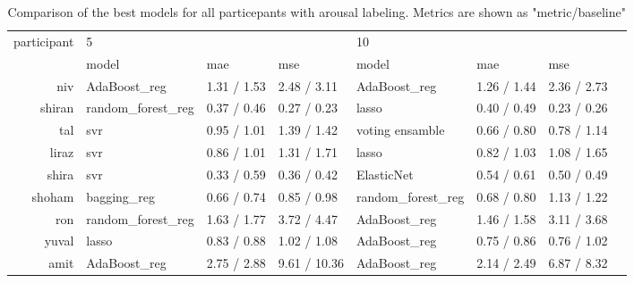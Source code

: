 \documentclass[../main.tex]{subfiles}
\begin{document}
\begin{table}[!h]
    \begin{tabular}{rlllllll}
        \toprule
        participant & \multicolumn{3}{l}{5} & \multicolumn{3}{l}{10} \\
              &               model & mae & mse &              model & mae & mse \\
        \midrule
             niv &       AdaBoost\_reg &         1.31 / 1.53 &        2.48 / 3.11 &       AdaBoost\_reg &         1.26 / 1.44 &        2.36 / 2.73 \\
          shiran &  random\_forest\_reg &         0.37 / 0.46 &        0.27 / 0.23 &              lasso &         0.40 / 0.49 &        0.23 / 0.26 \\
             tal &                svr &         0.95 / 1.01 &        1.39 / 1.42 &    voting ensamble &         0.66 / 0.80 &        0.78 / 1.14 \\
           liraz &                svr &         0.86 / 1.01 &        1.31 / 1.71 &              lasso &         0.82 / 1.03 &        1.08 / 1.65 \\
           shira &                svr &         0.33 / 0.59 &        0.36 / 0.42 &         ElasticNet &         0.54 / 0.61 &        0.50 / 0.49 \\
          shoham &        bagging\_reg &         0.66 / 0.74 &        0.85 / 0.98 &  random\_forest\_reg &         0.68 / 0.80 &        1.13 / 1.22 \\
             ron &  random\_forest\_reg &         1.63 / 1.77 &        3.72 / 4.47 &       AdaBoost\_reg &         1.46 / 1.58 &        3.11 / 3.68 \\
           yuval &              lasso &         0.83 / 0.88 &        1.02 / 1.08 &       AdaBoost\_reg &         0.75 / 0.86 &        0.76 / 1.02 \\
            amit &       AdaBoost\_reg &         2.75 / 2.88 &       9.61 / 10.36 &       AdaBoost\_reg &         2.14 / 2.49 &        6.87 / 8.32 \\
        \bottomrule
    \end{tabular}
    \caption{Comparison of the best models for all particepants with arousal labeling. Metrics are shown as "metric/baseline"}  
\end{table}
\end{document}
